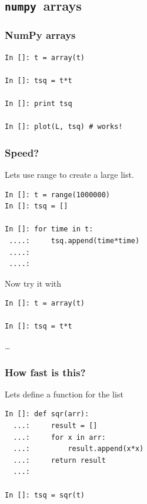 \documentclass[14pt,compress]{beamer}
\newcounter{time}
\newcommand{\num}{\texttt{numpy}}
\begin{document}
\subsection{\num\ arrays}

\begin{frame}[fragile]
\frametitle{NumPy arrays}
\begin{lstlisting}
In []: t = array(t)

In []: tsq = t*t

In []: print tsq

In []: plot(L, tsq) # works!
\end{lstlisting}  %
\end{frame}


\begin{frame}[fragile]
\frametitle{Speed?}

\noindent Lets use range to create a large list.

\begin{lstlisting}
In []: t = range(1000000)
In []: tsq = []

In []: for time in t:
 ....:     tsq.append(time*time)
 ....:
 ....:
\end{lstlisting}  %

\noindent Now try it with

\begin{lstlisting}
In []: t = array(t)

In []: tsq = t*t
\end{lstlisting}
\ldots
\end{frame}

\begin{frame}[fragile]
\frametitle{How fast is this?}
\noindent Lets define a function for the list
\begin{lstlisting}
In []: def sqr(arr):
  ...:     result = []
  ...:     for x in arr:
  ...:         result.append(x*x)
  ...:     return result
  ...:

In []: tsq = sqr(t)

\end{lstlisting}  %
\end{frame}
\end{document}
